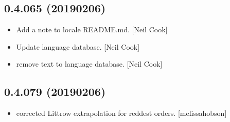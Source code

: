 \documentclass[a4paper,10pt,english]{report}
\begin{document}
\subsection{0.4.065 (2019\sphinxhyphen{}02\sphinxhyphen{}06)}
\label{\detokenize{misc/changelog:id212}}\begin{itemize}
\item {} 
Add a note to locale README.md. {[}Neil Cook{]}

\item {} 
Update language database. {[}Neil Cook{]}

\item {} 
 \sphinxhyphen{} remove text to language database. {[}Neil Cook{]}

\end{itemize}


\subsection{0.4.079 (2019\sphinxhyphen{}02\sphinxhyphen{}06)}
\label{\detokenize{misc/changelog:id213}}\begin{itemize}
\item {} 
 corrected Littrow extrapolation for reddest orders.
{[}melissa\sphinxhyphen{}hobson{]}

\end{itemize}
\end{document}
